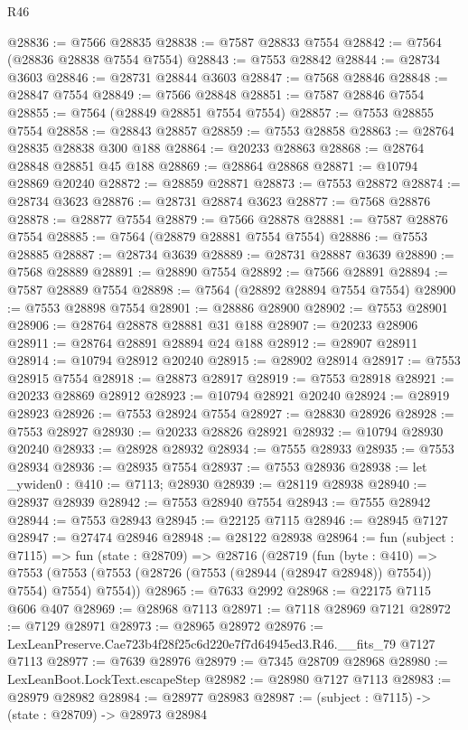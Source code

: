 \begin{lexlean}{R46}
\begin{coremodule}
@28836 := @7566 @28835
@28838 := @7587 @28833 @7554
@28842 := @7564 (@28836 @28838 @7554 @7554)
@28843 := @7553 @28842
@28844 := @28734 @3603
@28846 := @28731 @28844 @3603
@28847 := @7568 @28846
@28848 := @28847 @7554
@28849 := @7566 @28848
@28851 := @7587 @28846 @7554
@28855 := @7564 (@28849 @28851 @7554 @7554)
@28857 := @7553 @28855 @7554
@28858 := @28843 @28857
@28859 := @7553 @28858
@28863 := @28764 @28835 @28838 @300 @188
@28864 := @20233 @28863
@28868 := @28764 @28848 @28851 @45 @188
@28869 := @28864 @28868
@28871 := @10794 @28869 @20240
@28872 := @28859 @28871
@28873 := @7553 @28872
@28874 := @28734 @3623
@28876 := @28731 @28874 @3623
@28877 := @7568 @28876
@28878 := @28877 @7554
@28879 := @7566 @28878
@28881 := @7587 @28876 @7554
@28885 := @7564 (@28879 @28881 @7554 @7554)
@28886 := @7553 @28885
@28887 := @28734 @3639
@28889 := @28731 @28887 @3639
@28890 := @7568 @28889
@28891 := @28890 @7554
@28892 := @7566 @28891
@28894 := @7587 @28889 @7554
@28898 := @7564 (@28892 @28894 @7554 @7554)
@28900 := @7553 @28898 @7554
@28901 := @28886 @28900
@28902 := @7553 @28901
@28906 := @28764 @28878 @28881 @31 @188
@28907 := @20233 @28906
@28911 := @28764 @28891 @28894 @24 @188
@28912 := @28907 @28911
@28914 := @10794 @28912 @20240
@28915 := @28902 @28914
@28917 := @7553 @28915 @7554
@28918 := @28873 @28917
@28919 := @7553 @28918
@28921 := @20233 @28869 @28912
@28923 := @10794 @28921 @20240
@28924 := @28919 @28923
@28926 := @7553 @28924 @7554
@28927 := @28830 @28926
@28928 := @7553 @28927
@28930 := @20233 @28826 @28921
@28932 := @10794 @28930 @20240
@28933 := @28928 @28932
@28934 := @7555 @28933
@28935 := @7553 @28934
@28936 := @28935 @7554
@28937 := @7553 @28936
@28938 := let _ywiden0 : @410 := @7113; @28930
@28939 := @28119 @28938
@28940 := @28937 @28939
@28942 := @7553 @28940 @7554
@28943 := @7555 @28942
@28944 := @7553 @28943
@28945 := @22125 @7115
@28946 := @28945 @7127
@28947 := @27474 @28946
@28948 := @28122 @28938
@28964 := fun (subject : @7115) =>
  fun (state : @28709) =>
  @28716
    (@28719
      (fun (byte : @410) =>
      @7553 (@7553 (@7553 (@28726 (@7553 (@28944 (@28947 @28948)) @7554)) @7554) @7554) @7554))
@28965 := @7633 @2992
@28968 := @22175 @7115 @606 @407
@28969 := @28968 @7113
@28971 := @7118 @28969 @7121
@28972 := @7129 @28971
@28973 := @28965 @28972
@28976 := LexLeanPreserve.Cae723b4f28f25c6d220e7f7d64945ed3.R46.__fits_79 @7127 @7113
@28977 := @7639 @28976
@28979 := @7345 @28709 @28968
@28980 := LexLeanBoot.LockText.escapeStep
@28982 := @28980 @7127 @7113
@28983 := @28979 @28982
@28984 := @28977 @28983
@28987 := (subject : @7115) -> (state : @28709) -> @28973 @28984

\end{coremodule}
\end{lexlean}
